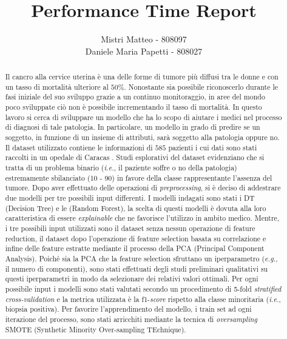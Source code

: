 \documentclass[a4paper, 12pt, conference]{ieeeconf}
\title{\LARGE \bf
Performance Time Report
}
\author{Mistri Matteo - 808097\\
	Daniele Maria Papetti - 808027
}
\begin{document}
\maketitle
\thispagestyle{empty}
\pagestyle{empty}

\begin{abstract}

Il cancro alla cervice uterina è una delle forme di tumore più diffusi tra le donne e con un tasso di mortalità ulteriore al $50\%$.
Nonostante sia possibile riconoscerlo durante le fasi iniziale del suo sviluppo grazie a un continuo monitoraggio, in aree del mondo poco sviluppate ciò non è possibile incrementando il tasso di mortalità.
In questo lavoro si cerca di sviluppare un modello che ha lo scopo di aiutare i medici nel processo di diagnosi di tale patologia. 
In particolare, un modello in grado di predire se un soggetto, in funzione di un insieme di attributi, sarà soggetto alla patologia oppure no.
Il dataset utilizzato contiene le informazioni di $585$ pazienti i cui dati sono stati raccolti in un opedale di Caracas \cite{ML}.
Studi esplorativi del dataset evidenziano che si tratta di un problema binario (\textit{i.e.}, il paziente soffre o no della patologia) estremamente sbilanciato (10 - 90) in favore della classe rappresentante l'assenza del tumore.
Dopo aver effettuato delle operazioni di \textit{preprocessing}, si è deciso di addestrare due modelli per tre possibili input differenti.
I modelli indagati sono stati i DT (Decision Tree) e le (Random Forest), la scelta di questi modelli è dovuta alla loro caratteristica di essere \textit{explainable} che ne favorisce l'utilizzo in ambito medico.
Mentre, i tre possibili input utilizzati sono il dataset senza nessun operazione di feature reduction, il dataset dopo l'operazione di feature selection basata su correlazione e infine delle feature estratte mediante il processo della PCA (Principal Component Analysis).
Poiché sia la PCA che la feature selection sfruttano un iperparametro (\textit{e.g.}, il numero di componenti), sono stati effettuati degli studi preliminari qualitativi su questi iperparametri in modo da selezionare dei relativi valori ottimali.
Per ogni possibile input i modelli sono stati valutati secondo un procedimento di 5-fold \textit{stratified cross-validation} e la metrica utilizzata è la f1-\textit{score} rispetto alla classe minoritaria (\textit{i.e.}, biopsia positiva).
Per favorire l'apprendimento del modello, i train set ad ogni iterazione del processo, sono stati arricchiti mediante la tecnica di \textit{oversampling} SMOTE (Synthetic Minority Over-sampling TEchnique).

\end{abstract}
\end{document}
